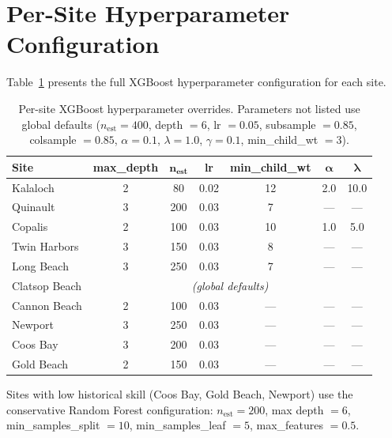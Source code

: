 \documentclass[preprint,12pt,authoryear]{elsarticle}
\begin{document}
\appendix

\section{Per-Site Hyperparameter Configuration}
\label{app:hyperparams}

Table~\ref{tab:app-xgb} presents the full XGBoost hyperparameter configuration for each site.

\begin{table}[!htbp]
\centering
\caption{Per-site XGBoost hyperparameter overrides. Parameters not listed use global defaults ($n_{\text{est}} = 400$, depth $= 6$, lr $= 0.05$, subsample $= 0.85$, colsample $= 0.85$, $\alpha = 0.1$, $\lambda = 1.0$, $\gamma = 0.1$, min\_child\_wt $= 3$).}
\label{tab:app-xgb}
\small
\begin{tabular}{@{}lcccccc@{}}
\toprule
\textbf{Site} & \textbf{max\_depth} & $\boldsymbol{n_{\text{est}}}$ & \textbf{lr} & \textbf{min\_child\_wt} & $\boldsymbol{\alpha}$ & $\boldsymbol{\lambda}$ \\
\midrule
Kalaloch      & 2 & 80  & 0.02 & 12 & 2.0 & 10.0 \\
Quinault      & 3 & 200 & 0.03 & 7  & --- & --- \\
Copalis       & 2 & 100 & 0.03 & 10 & 1.0 & 5.0 \\
Twin Harbors  & 3 & 150 & 0.03 & 8  & --- & --- \\
Long Beach    & 3 & 250 & 0.03 & 7  & --- & --- \\
Clatsop Beach & \multicolumn{6}{c}{\textit{(global defaults)}} \\
Cannon Beach  & 2 & 100 & 0.03 & --- & --- & --- \\
Newport       & 3 & 250 & 0.03 & --- & --- & --- \\
Coos Bay      & 3 & 200 & 0.03 & --- & --- & --- \\
Gold Beach    & 2 & 150 & 0.03 & --- & --- & --- \\
\bottomrule
\end{tabular}
\end{table}

Sites with low historical skill (Coos Bay, Gold Beach, Newport) use the conservative Random Forest configuration: $n_{\text{est}} = 200$, max depth $= 6$, min\_samples\_split $= 10$, min\_samples\_leaf $= 5$, max\_features $= 0.5$.
\end{document}
